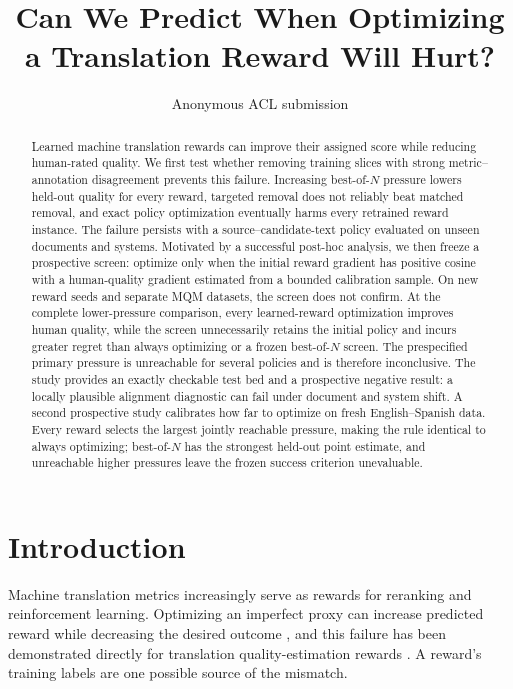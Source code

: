 \documentclass[11pt]{article}
\title{Can We Predict When Optimizing a Translation Reward Will Hurt?}
\author{Anonymous ACL submission}
\begin{document}
\maketitle

\begin{abstract}
Learned machine translation rewards can improve their assigned score while
reducing human-rated quality.  We first test whether removing training slices
with strong metric--annotation disagreement prevents this failure.  Increasing
best-of-$N$ pressure lowers held-out quality for every reward, targeted removal
does not reliably beat matched removal, and exact policy optimization eventually
harms every retrained reward instance.  The failure persists with a
source--candidate-text policy evaluated on unseen documents and systems.
Motivated by a successful post-hoc analysis, we then freeze a prospective
screen: optimize only when the initial reward gradient has positive cosine with
a human-quality gradient estimated from a bounded calibration sample.  On new
reward seeds and separate MQM datasets, the screen does not confirm.  At the
complete lower-pressure comparison, every learned-reward optimization improves
human quality, while the screen unnecessarily retains the initial policy and
incurs greater regret than always optimizing or a frozen best-of-$N$ screen.
The prespecified primary pressure is unreachable for several policies and is
therefore inconclusive.  The study provides an exactly checkable test bed and a
prospective negative result: a locally plausible alignment diagnostic can fail
under document and system shift.  A second prospective study calibrates how far
to optimize on fresh English--Spanish data.  Every reward selects the largest
jointly reachable pressure, making the rule identical to always optimizing;
best-of-$N$ has the strongest held-out point estimate, and unreachable higher
pressures leave the frozen success criterion unevaluable.
\end{abstract}

\section{Introduction}

Machine translation metrics increasingly serve as rewards for reranking and
reinforcement learning.  Optimizing an imperfect proxy can increase predicted
reward while decreasing the desired outcome \citep{gao-etal-2023-scaling}, and
this failure has been demonstrated directly for translation quality-estimation
rewards \citep{he-etal-2024-improving}.  A reward's training labels are one
possible source of the mismatch.
\end{document}
